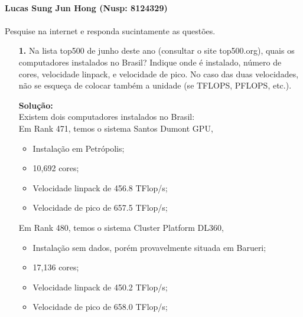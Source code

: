 \documentclass[12pt]{article}
\begin{document}
\begin{center}
{} \\
\vspace{0.5cm}
{}
\vspace{0.5cm}

\textbf{Lucas Sung Jun Hong (Nusp: 8124329)}
\end{center}

\paragraph{} Pesquise na internet e responda sucintamente as questões.

\begin{itemize}
  \item[{\bf 1.}] Na lista top500 de junho deste ano (consultar o site top500.org), quais os
  computadores instalados no Brasil? Indique onde é instalado, número de cores,
  velocidade linpack, e velocidade de pico. No caso das duas velocidades, não se
  esqueça de colocar também a unidade (se TFLOPS, PFLOPS, etc.).

  \vspace{0.5cm}
  \textbf{Solução:} \\  
  Existem dois computadores instalados no Brasil: \\
  Em Rank 471, temos o sistema Santos Dumont GPU, \\

  \begin{itemize}
    \item Instalação em Petrópolis;
    \item 10,692 cores;
    \item Velocidade linpack de 456.8 TFlop/s;
    \item Velocidade de pico de 657.5 TFlop/s;
  \end{itemize}

  Em Rank 480, temos o sistema Cluster Platform DL360, \\

  \begin{itemize}
    \item Instalação sem dados, porém provavelmente situada em Barueri;
    \item 17,136 cores;
    \item Velocidade linpack de 450.2 TFlop/s;
    \item Velocidade de pico de 658.0 TFlop/s;
  \end{itemize}


\end{itemize}
\end{document}
